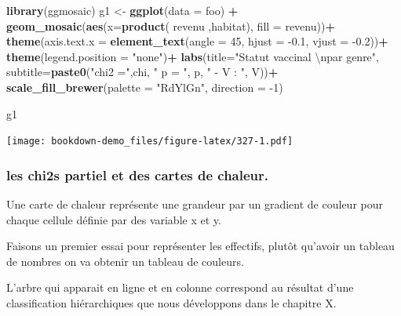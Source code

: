 \documentclass[
]{book}
\newenvironment{Shaded}{\begin{snugshade}}{\end{snugshade}}
\newcommand{\CharTok}[1]{\textcolor[rgb]{0.31,0.60,0.02}{#1}}
\newcommand{\DataTypeTok}[1]{\textcolor[rgb]{0.13,0.29,0.53}{#1}}
\newcommand{\DecValTok}[1]{\textcolor[rgb]{0.00,0.00,0.81}{#1}}
\newcommand{\FloatTok}[1]{\textcolor[rgb]{0.00,0.00,0.81}{#1}}
\newcommand{\KeywordTok}[1]{\textcolor[rgb]{0.13,0.29,0.53}{\textbf{#1}}}
\newcommand{\NormalTok}[1]{#1}
\newcommand{\OperatorTok}[1]{\textcolor[rgb]{0.81,0.36,0.00}{\textbf{#1}}}
\newcommand{\StringTok}[1]{\textcolor[rgb]{0.31,0.60,0.02}{#1}}
\begin{document}
\begin{Shaded}
\begin{Highlighting}[]
\KeywordTok{library}\NormalTok{(ggmosaic)}
\NormalTok{g1 <-}\StringTok{ }\KeywordTok{ggplot}\NormalTok{(}\DataTypeTok{data =}\NormalTok{ foo) }\OperatorTok{+}
\StringTok{  }\KeywordTok{geom_mosaic}\NormalTok{(}\KeywordTok{aes}\NormalTok{(}\DataTypeTok{x=}\KeywordTok{product}\NormalTok{( revenu ,habitat), }\DataTypeTok{fill =}\NormalTok{ revenu))}\OperatorTok{+}\StringTok{  }
\StringTok{  }\KeywordTok{theme}\NormalTok{(}\DataTypeTok{axis.text.x =} \KeywordTok{element_text}\NormalTok{(}\DataTypeTok{angle =} \DecValTok{45}\NormalTok{, }\DataTypeTok{hjust =} \FloatTok{-0.1}\NormalTok{, }\DataTypeTok{vjust =} \FloatTok{-0.2}\NormalTok{))}\OperatorTok{+}\StringTok{ }
\StringTok{  }\KeywordTok{theme}\NormalTok{(}\DataTypeTok{legend.position =} \StringTok{"none"}\NormalTok{)}\OperatorTok{+}
\StringTok{  }\KeywordTok{labs}\NormalTok{(}\DataTypeTok{title=}\StringTok{"Statut vaccinal }\CharTok{\textbackslash{}n}\StringTok{par genre"}\NormalTok{, }
       \DataTypeTok{subtitle=}\KeywordTok{paste0}\NormalTok{(}\StringTok{"chi2 ="}\NormalTok{,chi, }\StringTok{" p = "}\NormalTok{, p, }\StringTok{" - V : "}\NormalTok{, V))}\OperatorTok{+}\StringTok{    }
\StringTok{  }\KeywordTok{scale_fill_brewer}\NormalTok{(}\DataTypeTok{palette =} \StringTok{"RdYlGn"}\NormalTok{, }\DataTypeTok{direction =} \DecValTok{-1}\NormalTok{) }

\NormalTok{g1}
\end{Highlighting}
\end{Shaded}

\texttt{[image: bookdown-demo\_files/figure-latex/327-1.pdf]}

\hypertarget{les-chi2s-partiel-et-des-cartes-de-chaleur.}{%
\subsubsection{les chi2s partiel et des cartes de chaleur.}\label{les-chi2s-partiel-et-des-cartes-de-chaleur.}}

Une carte de chaleur représente une grandeur par un gradient de couleur pour chaque cellule définie par des variable x et y.

Faisons un premier essai pour représenter les effectifs, plutôt qu'avoir un tableau de nombres on va obtenir un tableau de couleurs.

L'arbre qui apparait en ligne et en colonne correspond au résultat d'une classification hiérarchiques que nous développons dans le chapitre X.
\end{document}
